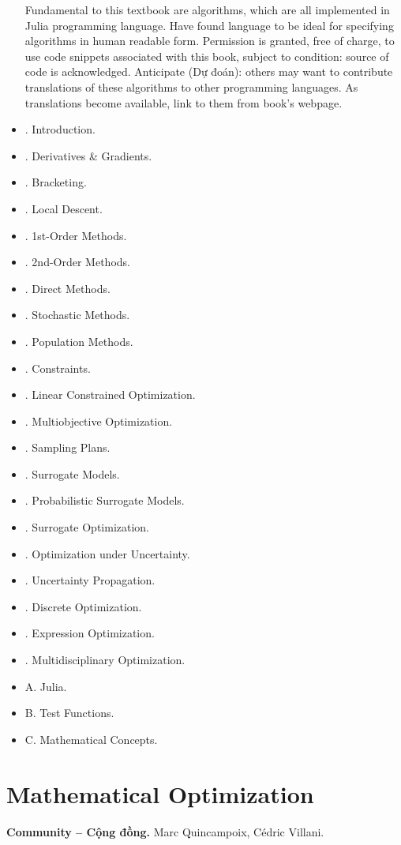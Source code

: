 \documentclass{article}
\begin{document}
\begin{itemize}
	Fundamental to this textbook are algorithms, which are all implemented in Julia programming language. Have found language to be ideal for specifying algorithms in human readable form. Permission is granted, free of charge, to use code snippets associated with this book, subject to condition: source of code is acknowledged. Anticipate (Dự đoán): others may want to contribute translations of these algorithms to other programming languages. As translations become available, link to them from book's webpage.
	\item {. Introduction.}
	\item {. Derivatives \& Gradients.}
	\item {. Bracketing.}
	\item {. Local Descent.}
	\item {. 1st-Order Methods.}
	\item {. 2nd-Order Methods.}
	\item {. Direct Methods.}
	\item {. Stochastic Methods.}
	\item {. Population Methods.}
	\item {. Constraints.}
	\item {. Linear Constrained Optimization.}
	\item {. Multiobjective Optimization.}
	\item {. Sampling Plans.}
	\item {. Surrogate Models.}
	\item {. Probabilistic Surrogate Models.}
	\item {. Surrogate Optimization.}
	\item {. Optimization under Uncertainty.}
	\item {. Uncertainty Propagation.}
	\item {. Discrete Optimization.}
	\item {. Expression Optimization.}
	\item {. Multidisciplinary Optimization.}
	\item {\sf A. Julia.}
	\item {\sf B. Test Functions.}
	\item {\sf C. Mathematical Concepts.}
\end{itemize}


\section{Mathematical Optimization}
\textbf{\textsf{Community -- Cộng đồng.}} {\sc Marc Quincampoix, C\'{e}dric Villani}.
\end{document}
